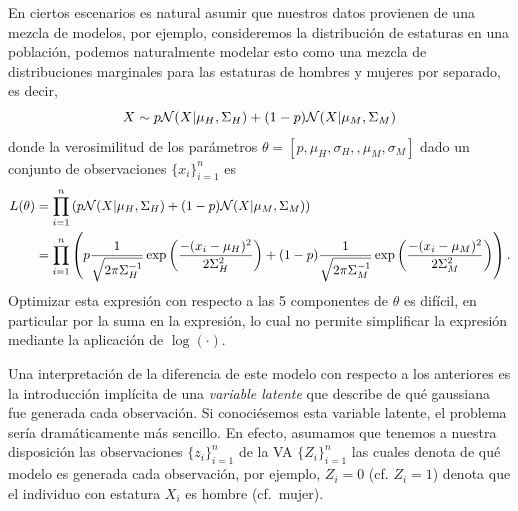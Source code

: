 En ciertos escenarios es natural asumir que nuestros datos provienen de una mezcla de modelos, por ejemplo, consideremos la distribución de estaturas en una población, podemos naturalmente modelar esto como una mezcla de distribuciones marginales para las estaturas de hombres y mujeres por separado, es decir, 
\begin{equation}
	X\sim p{\mathcal N}(X|\mu_H,\Sigma_H) + (1-p){\mathcal N}(X|\mu_M,\Sigma_M)
\end{equation}
donde la verosimilitud de los parámetros $\theta = [p, \mu_H, \sigma_H,, \mu_M, \sigma_M]$ dado un conjunto de observaciones $\{x_i\}_{i=1}^n$ es
\begin{align*}
	L(\theta) 	&= \prod_{i=1}^n \left( p{\mathcal N}(X|\mu_H,\Sigma_H) + (1-p){\mathcal N}(X|\mu_M,\Sigma_M) \right)\\
				&= \prod_{i=1}^n \left( p\frac{1}{\sqrt{2\pi\Sigma_H^{-1}}}\exp\left(\frac{-(x_i-\mu_H)^2}{2\Sigma^2_H}\right) + (1-p)\frac{1}{\sqrt{2\pi\Sigma_M^{-1}}}\exp\left(\frac{-(x_i-\mu_M)^2}{2\Sigma^2_M}\right)\right).
\end{align*}
Optimizar esta expresión con respecto a las 5 componentes de $\theta$ es difícil, en particular por la suma en la expresión, lo cual no permite simplificar la expresión mediante la aplicación de $\log(\cdot)$. 

Una interpretación de la diferencia de este modelo con respecto a los anteriores es la introducción implícita de una  \textit{variable latente} que describe de qué gaussiana fue generada cada observación. Si conociésemos esta variable latente, el problema sería dramáticamente más sencillo. En efecto, asumamos que tenemos a nuestra disposición las observaciones $\{z_i\}_{i=1}^n$ de la VA $\{Z_i\}_{i=1}^n$ las cuales denota de qué modelo es generada cada observación, por ejemplo, $Z_i=0$ (cf. $Z_i=1$) denota que el individuo con estatura $X_i$ es hombre (cf.~mujer).
 

